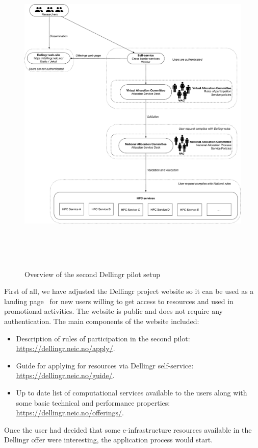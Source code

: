 \documentclass{article}
\newcommand{\dell}{Dellingr\xspace}
\newcommand{\einfra}{e-infrastructure\xspace}
\begin{document}
\begin{figure}
\centering
\includegraphics[height=450pt]{diagram.pdf}
\caption{Overview of the second \dell pilot setup}
\end{figure}

First of all, we have adjusted the \dell project website so it can be used as a landing page~\cite{dellingr-landing} for new users willing to get access to resources and used in promotional activities. 
The website is public and does not require any authentication.
The main components of the website included:
\begin{itemize}
    \item Description of rules of participation in the second pilot: \url{https://dellingr.neic.no/apply/}.
    \item Guide for applying for resources via \dell self-service: \url{https://dellingr.neic.no/guide/}.
    \item Up to date list of computational services available to the users along with some basic technical and performance properties: \url{https://dellingr.neic.no/offerings/}.
\end{itemize}
Once the user had decided that some \einfra resources available in the \dell offer were interesting, the application process would start. 
\end{document}

